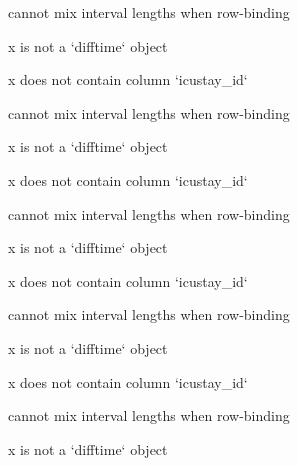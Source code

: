 \documentclass[
]{jss}
\begin{document}
\begin{CodeChunk}
\begin{CodeOutput}
cannot mix interval lengths when row-binding
\end{CodeOutput}

\begin{CodeOutput}
x is not a `difftime` object
\end{CodeOutput}

\begin{CodeOutput}
x does not contain column `icustay_id`
\end{CodeOutput}

\begin{CodeOutput}
cannot mix interval lengths when row-binding
\end{CodeOutput}

\begin{CodeOutput}
x is not a `difftime` object
\end{CodeOutput}

\begin{CodeOutput}
x does not contain column `icustay_id`
\end{CodeOutput}

\begin{CodeOutput}
cannot mix interval lengths when row-binding
\end{CodeOutput}

\begin{CodeOutput}
x is not a `difftime` object
\end{CodeOutput}

\begin{CodeOutput}
x does not contain column `icustay_id`
\end{CodeOutput}

\begin{CodeOutput}
cannot mix interval lengths when row-binding
\end{CodeOutput}

\begin{CodeOutput}
x is not a `difftime` object
\end{CodeOutput}

\begin{CodeOutput}
x does not contain column `icustay_id`
\end{CodeOutput}

\begin{CodeOutput}
cannot mix interval lengths when row-binding
\end{CodeOutput}

\begin{CodeOutput}
x is not a `difftime` object
\end{CodeOutput}


\end{CodeChunk}
\end{document}
